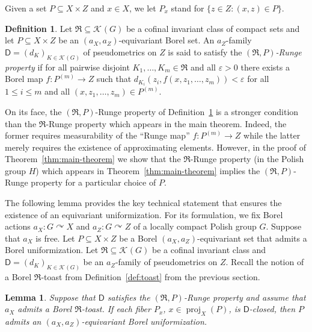 \documentclass[12pt]{paper}
\numberwithin{equation}{section}
\theoremstyle{plain}
\newtheorem{lemma}[theorem]{Lemma}
\theoremstyle{definition}
\newtheorem{definition}[theorem]{Definition}
\newcommand{\mfR}{\mathfrak{R}}
\newcommand{\vietoris}[2][]{\mathcal{K}_{#1}(#2)}
\newcommand{\unifm}{\mathsf{D}}
\DeclareMathOperator{\proj}{\mathrm{proj}}
\newcommand{\acts}{\curvearrowright}
\newcommand{\say}[1]{``#1''}
\renewcommand{\epsilon}{\varepsilon}
\begin{document}
Given a set \(P \subseteq X \times Z\) and \(x \in X\), we let \(P_{x}\) stand for
\(\{z \in Z : (x,z) \in P\}\).


\begin{definition}
\label{def:runge-property}
Let \(\mfR \subseteq \vietoris{G}\) be a cofinal invariant class of compact sets and let
\(P \subseteq X \times Z\) be an \((a_{X}, a_{Z})\)-equivariant Borel set.  An \(a_{Z}\)-family
\(\unifm = (d_{K})_{K \in \vietoris{G}}\) of pseudometrics on \(Z\) is said to satisfy the
\emph{\((\mfR, P)\)-Runge property} if for all pairwise disjoint \(K_{1}, \ldots, K_{m} \in \mfR\)
and all \(\epsilon > 0\) there exists a Borel map \(f : P^{(m)} \to Z\) such that
\(d_{K_{i}}(z_{i}, f(x, z_{1}, \ldots, z_{m})) < \epsilon\)
for all \(1 \le i \le m\) and all
\((x, z_{1}, \ldots, z_{m}) \in P^{(m)}\).
\end{definition}

On its face, the \((\mfR, P)\)-Runge property of Definition~\ref{def:runge-property} is a stronger
condition than the \(\mfR\)-Runge property which appears in the main theorem.  Indeed, the former
requires measurability of the \say{Runge map} \(f : P^{(m)} \to Z\) while the latter merely requires
the existence of approximating elements.  However, in the proof of Theorem~\ref{thm:main-theorem} we
show that the \(\mfR\)-Runge property (in the Polish group \(H\)) which appears in
Theorem~\ref{thm:main-theorem} implies the \((\mfR, P)\)-Runge property for a particular choice of
\(P\).

The following lemma provides the key technical statement that ensures the existence of an
equivariant uniformization.  For its formulation, we fix Borel actions \(a_{X} : G \acts X\) and
\(a_{Z} : G \acts Z\) of a locally compact Polish group \(G\).  Suppose that \(a_{X}\) is free.  Let
\(P \subseteq X \times Z\) be a Borel \((a_{X}, a_{Z})\)-equivariant set that admits a Borel
uniformization.  Let \(\mfR \subseteq \vietoris{G}\) be a cofinal invariant class and
\(\unifm = (d_{K})_{K \in \vietoris{G}}\) be an \(a_{Z}\)-family of pseudometrics on \(Z\).  Recall
the notion of a Borel \(\mfR\)-toast from Definition~\ref{def:toast} from the previous section.

\begin{lemma}
  \label{lem:runge-equivariant-uniformization}
  Suppose that \(\unifm\) satisfies the \((\mfR, P)\)-Runge property and assume that \(a_{X}\)
  admits a Borel \(\mfR\)-toast.  If each fiber \(P_{x}\), \(x \in \proj_{X}(P)\), is
  \(\unifm\)-closed, then \(P\) admits an \((a_{X}, a_{Z})\)-equivariant Borel uniformization.
\end{lemma}
\end{document}
